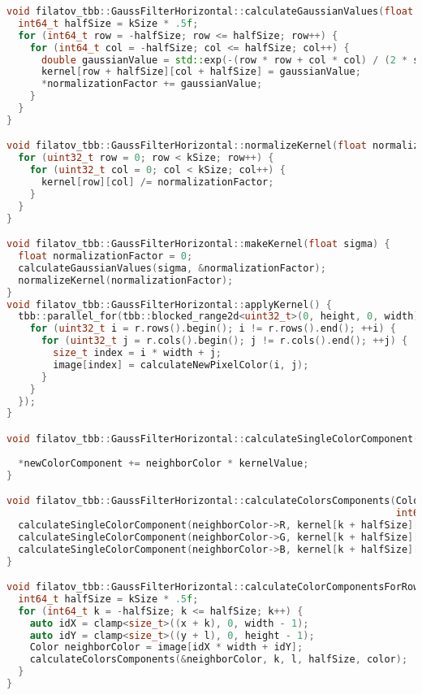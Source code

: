 \documentclass{report}
\begin{document}
\begin{lstlisting}[language=C++,caption=TBB версия]
void filatov_tbb::GaussFilterHorizontal::calculateGaussianValues(float sigma, float* normalizationFactor) {
  int64_t halfSize = kSize * .5f;
  for (int64_t row = -halfSize; row <= halfSize; row++) {
    for (int64_t col = -halfSize; col <= halfSize; col++) {
      double gaussianValue = std::exp(-(row * row + col * col) / (2 * sigma * sigma));
      kernel[row + halfSize][col + halfSize] = gaussianValue;
      *normalizationFactor += gaussianValue;
    }
  }
}

void filatov_tbb::GaussFilterHorizontal::normalizeKernel(float normalizationFactor) {
  for (uint32_t row = 0; row < kSize; row++) {
    for (uint32_t col = 0; col < kSize; col++) {
      kernel[row][col] /= normalizationFactor;
    }
  }
}

void filatov_tbb::GaussFilterHorizontal::makeKernel(float sigma) {
  float normalizationFactor = 0;
  calculateGaussianValues(sigma, &normalizationFactor);
  normalizeKernel(normalizationFactor);
}
void filatov_tbb::GaussFilterHorizontal::applyKernel() {
  tbb::parallel_for(tbb::blocked_range2d<uint32_t>(0, height, 0, width), [&](const tbb::blocked_range2d<uint32_t>& r) {
    for (uint32_t i = r.rows().begin(); i != r.rows().end(); ++i) {
      for (uint32_t j = r.cols().begin(); j != r.cols().end(); ++j) {
        size_t index = i * width + j;
        image[index] = calculateNewPixelColor(i, j);
      }
    }
  });
}

void filatov_tbb::GaussFilterHorizontal::calculateSingleColorComponent(uint8_t neighborColor, float kernelValue,
                                                                       float* newColorComponent) {
  *newColorComponent += neighborColor * kernelValue;
}

void filatov_tbb::GaussFilterHorizontal::calculateColorsComponents(Color* neighborColor, int64_t k, int64_t l,
                                                                   int64_t halfSize, ColorF* color) {
  calculateSingleColorComponent(neighborColor->R, kernel[k + halfSize][l + halfSize], &color->R);
  calculateSingleColorComponent(neighborColor->G, kernel[k + halfSize][l + halfSize], &color->G);
  calculateSingleColorComponent(neighborColor->B, kernel[k + halfSize][l + halfSize], &color->B);
}

void filatov_tbb::GaussFilterHorizontal::calculateColorComponentsForRow(int64_t l, size_t x, size_t y, ColorF* color) {
  int64_t halfSize = kSize * .5f;
  for (int64_t k = -halfSize; k <= halfSize; k++) {
    auto idX = clamp<size_t>((x + k), 0, width - 1);
    auto idY = clamp<size_t>((y + l), 0, height - 1);
    Color neighborColor = image[idX * width + idY];
    calculateColorsComponents(&neighborColor, k, l, halfSize, color);
  }
}


\end{lstlisting}
\end{document}
